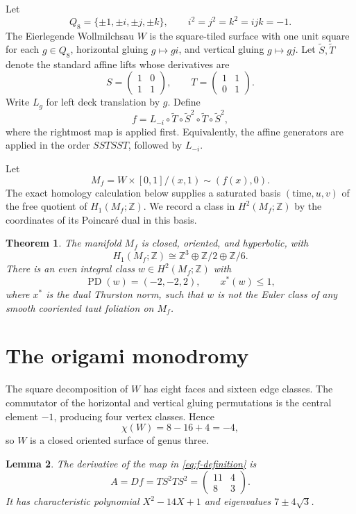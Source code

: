 \documentclass[10pt,reqno]{amsart}
\newtheorem{theorem}{Theorem}[section]
\newtheorem{lemma}[theorem]{Lemma}
\theoremstyle{definition}
\newcommand{\Z}{\mathbb Z}
\newcommand{\PD}{\operatorname{PD}}
\begin{document}
Let
\[
 Q_8=\{\pm1,\pm i,\pm j,\pm k\},
 \qquad i^2=j^2=k^2=ijk=-1.
\]
The Eierlegende Wollmilchsau \(W\) is the square-tiled surface with one unit
square for each \(g\in Q_8\), horizontal gluing \(g\mapsto gi\), and
vertical gluing \(g\mapsto gj\).  Let \(\widetilde S,\widetilde T\) denote
the standard affine lifts whose derivatives are
\[
 S=\begin{pmatrix}1&0\\1&1\end{pmatrix},
 \qquad
 T=\begin{pmatrix}1&1\\0&1\end{pmatrix}.
\]
Write \(L_g\) for left deck translation by \(g\).  Define
\begin{equation}\label{eq:f-definition}
 f=L_{-i}\circ\widetilde T\circ\widetilde S^2
       \circ\widetilde T\circ\widetilde S^2,
\end{equation}
where the rightmost map is applied first.  Equivalently, the affine
generators are applied in the order \(SSTSST\), followed by \(L_{-i}\).

Let
\[
 M_f=W\times[0,1]/(x,1)\sim(f(x),0).
\]
The exact homology calculation below supplies a saturated basis
\((\text{time},u,v)\) of the free quotient of \(H_1(M_f;\Z)\).  We record a
class in \(H^2(M_f;\Z)\) by the coordinates of its Poincar\'e dual in this
basis.

\begin{theorem}\label{thm:main}
The manifold \(M_f\) is closed, oriented, and hyperbolic, with
\[
 H_1(M_f;\Z)\cong\Z^3\oplus\Z/2\oplus\Z/6.
\]
There is an even integral class \(w\in H^2(M_f;\Z)\) with
\[
 \PD(w)=(-2,-2,2),
 \qquad x^*(w)\leq1,
\]
where \(x^*\) is the dual Thurston norm, such that \(w\) is not the Euler
class of any smooth cooriented taut foliation on \(M_f\).
\end{theorem}

\section{The origami monodromy}

The square decomposition of \(W\) has eight faces and sixteen edge classes.
The commutator of the horizontal and vertical gluing permutations is the
central element \(-1\), producing four vertex classes.  Hence
\[
 \chi(W)=8-16+4=-4,
\]
so \(W\) is a closed oriented surface of genus three.

\begin{lemma}\label{lem:derivative}
The derivative of the map in \eqref{eq:f-definition} is
\[
 A=Df=TS^2TS^2=
 \begin{pmatrix}11&4\\8&3\end{pmatrix}.
\]
It has characteristic polynomial \(X^2-14X+1\) and eigenvalues
\(7\pm4\sqrt3\).
\end{lemma}
\end{document}
